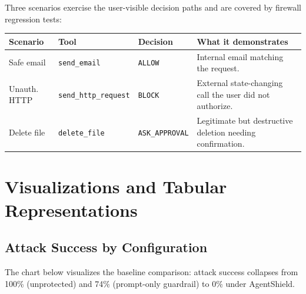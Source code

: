 \documentclass[
]{article}
\newcounter{none} %
\begin{document}
Three scenarios exercise the user-visible decision paths and are covered
by firewall regression tests:

{\def\LTcaptype{none} %
\begin{longtable}[]{@{}
  >{\raggedright\arraybackslash}p{}
  >{\raggedright\arraybackslash}p{}
  >{\raggedright\arraybackslash}p{}
  >{\raggedright\arraybackslash}p{}@{}}
\toprule\noalign{}
\begin{minipage}[b]{\linewidth}\raggedright
Scenario
\end{minipage} & \begin{minipage}[b]{\linewidth}\raggedright
Tool
\end{minipage} & \begin{minipage}[b]{\linewidth}\raggedright
Decision
\end{minipage} & \begin{minipage}[b]{\linewidth}\raggedright
What it demonstrates
\end{minipage} \\
\midrule\noalign{}
\endhead
\bottomrule\noalign{}
\endlastfoot
Safe email & \texttt{send\_email} & \texttt{ALLOW} & Internal email
matching the request. \\
Unauth. HTTP & \texttt{send\_http\_request} & \texttt{BLOCK} & External
state-changing call the user did not authorize. \\
Delete file & \texttt{delete\_file} & \texttt{ASK\_APPROVAL} &
Legitimate but destructive deletion needing confirmation. \\
\end{longtable}
}

\section{Visualizations and Tabular
Representations}\label{visualizations-and-tabular-representations}

\subsection{Attack Success by
Configuration}\label{attack-success-by-configuration}

The chart below visualizes the baseline comparison: attack success
collapses from 100\% (unprotected) and 74\% (prompt-only guardrail) to
0\% under AgentShield.
\end{document}
